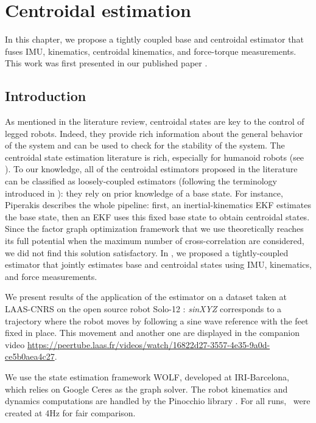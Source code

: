 \chapter{Centroidal estimation}
\label{chp:centroidal_estimation}
\minitoc
\bigskip


In this chapter, we propose a tightly coupled base and centroidal estimator that fuses IMU, kinematics, centroidal kinematics, and force-torque measurements.
This work was first presented in our published paper \cite{fourmy2021contact}.

\section{Introduction}

As mentioned in the literature review, centroidal states are key to the control of legged robots. Indeed, they provide rich information about the general
behavior of the system and can be used to check for the stability of the system. The centroidal state estimation literature is rich, especially for humanoid
robots (see ). To our knowledge, all of the centroidal estimators proposed in the literature can be classified as loosely-coupled estimators 
(following the terminology introduced in ): they rely on prior knowledge of a base state. For instance, Piperakis \cite{piperakis2018nonlinear} 
describes the whole pipeline: first, an inertial-kinematics EKF estimates the base state, then an EKF uses this fixed base state to obtain centroidal states. 
Since the factor graph optimization framework that we use theoretically reaches its full potential when the maximum number of cross-correlation
are considered, we did not find this solution satisfactory. In \cite{fourmy2021contact}, we proposed a tightly-coupled estimator that jointly estimates
base and centroidal states using IMU, kinematics, and force measurements.


We present results of the application of the estimator on a dataset taken at LAAS-CNRS on the open source robot Solo-12 \cite{grimminger2020open}:
\textit{sinXYZ} corresponds to a trajectory where the robot moves by following a sine wave reference with the feet fixed in place. 
This movement and another one are displayed in the companion video \url{https://peertube.laas.fr/videos/watch/16822d27-3557-4e35-9a0d-ce5b0aea4c27}.

We use the state estimation framework WOLF, developed at IRI-Barcelona, which relies on Google Ceres \cite{ceres-solver} as the graph solver. 
The robot kinematics and dynamics computations are handled by the Pinocchio library \cite{carpentier2019pinocchio}. For all runs, \keyframes\ were created 
at 4Hz for fair comparison.



